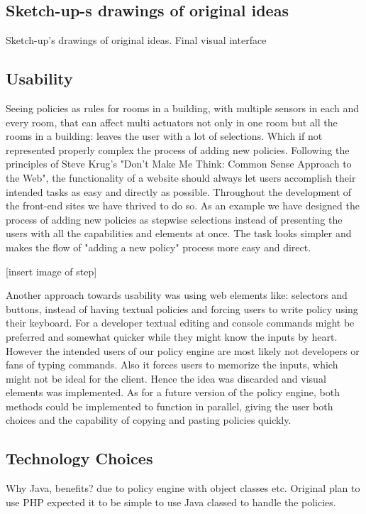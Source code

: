 \subsection{Sketch-up-s drawings of original ideas}

	Sketch-up's drawings of original ideas.
	Final visual interface
	

\subsection{Usability}
Seeing policies as rules for rooms in a building, with multiple sensors in each and every room, that can affect multi actuators not only in one room but all the rooms in a building: leaves the user with a lot of selections. Which if not represented properly complex the process of adding new policies.
Following the principles of Steve Krug's "Don't Make Me Think: Common Sense Approach to the Web"\cite{Krug:2005:DMM:1051204}, the functionality of a website should always let users accomplish their intended tasks as easy and directly as possible. Throughout the development of the front-end sites we have thrived to do so.
As an example we have designed the process of adding new policies as stepwise selections instead of presenting the users with all the capabilities and elements at once. The task looks simpler and makes the flow of  "adding a new policy" process more easy and direct.

[insert image of step]

Another approach towards usability was using web elements like: selectors and buttons, instead of having textual policies and forcing users to write policy using their keyboard.
For a developer textual editing and console commands might be preferred and somewhat quicker while they might know the inputs by heart. However the intended users of our policy engine are most likely not developers or fans of typing commands. Also it forces users to memorize the inputs, which might not be ideal for the client. Hence the idea was discarded and visual elements was implemented.
As for a future version of the policy engine, both methods could be implemented to function in parallel, giving the user both choices and the capability of copying and pasting policies quickly.


\subsection{Technology Choices}
Why Java, benefits? due to policy engine with object classes etc. Original plan to use PHP expected it to be simple to use Java classed to handle the policies.
